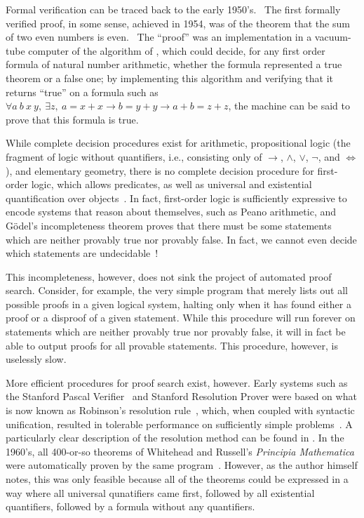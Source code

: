 Formal verification can be traced back to the early 1950's.~\cite{Brief2019Darbari}
The first formally verified proof, in some sense, achieved in 1954, was of the theorem that the sum of two even numbers is even.~\cite{davis2001early}
The ``proof'' was an implementation in a vacuum-tube computer of the algorithm of \textcite{Uber1929Presburger}, which could decide, for any first order formula of natural number arithmetic, whether the formula represented a true theorem or a false one;
by implementing this algorithm and verifying that it returns ``true'' on a formula such as $\forall a\ b\ x\ y,\ \exists z,\ a = x + x \to b = y + y \to a + b = z + z$, the machine can be said to prove that this formula is true.

While complete decision procedures exist for arithmetic, propositional logic (the fragment of logic without quantifiers, i.e., consisting only of $\to$, $\wedge$, $\vee$, $\neg$, and $\iff$), and elementary geometry, there is no complete decision procedure for first-order logic, which allows predicates, as well as universal and existential quantification over objects~\cite{davis2001early}.
In fact, first-order logic is sufficiently expressive to encode systems that reason about themselves, such as Peano arithmetic, and G\"odel's incompleteness theorem proves that there must be some statements which are neither provably true nor provably false.
In fact, we cannot even decide which statements are undecidable~\cite{Are2011Makholm}!

This incompleteness, however, does not sink the project of automated proof search.
Consider, for example, the very simple program that merely lists out all possible proofs in a given logical system, halting only when it has found either a proof or a disproof of a given statement.
While this procedure will run forever on statements which are neither provably true nor provably false, it will in fact be able to output proofs for all provable statements.
This procedure, however, is uselessly slow.

More efficient procedures for proof search exist, however.
Early systems such as the Stanford Pascal Verifier~\cite{luckham1979stanford} and Stanford Resolution Prover were based on what is now known as Robinson's resolution rule~\cite{Machine1965Robinson}, which, when coupled with syntactic unification, resulted in tolerable performance on sufficiently simple problems~\cite{davis2001early,Brief2019Darbari}.
A particularly clear description of the resolution method can be found in \textcite[pp.~17--18]{Metamathematics1994Shankar}.
In the 1960's, all 400-or-so theorems of Whitehead and Russell's \emph{Principia Mathematica} were automatically proven by the same program~\cite[p.~9]{davis2001early}.
However, as the author himself notes, this was only feasible because all of the theorems could be expressed in a way where all universal qunatifiers came first, followed by all existential quantifiers, followed by a formula without any quantifiers.

